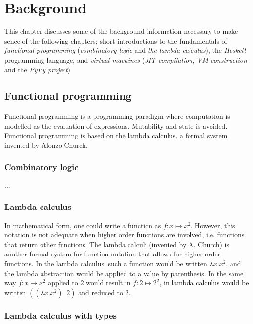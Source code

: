 



\chapter{Background}

This chapter discusses some of the background information necessary to make sence of the
following chapters; short introductions to the fundamentals of \emph{functional programming} 
(\emph{combinatory logic} and \emph{the lambda calculus}), the \emph{Haskell} 
programming language, and \emph{virtual machines} (\emph{JIT compilation}, \emph{VM construction} 
and the \emph{PyPy project})






\section{Functional programming}

Functional programming is a programming paradigm where computation is modelled as the evaluation
of expressions. Mutability and state is avoided. Functional programming is based on the 
lambda calculus, a formal system invented by Alonzo Church.

\subsection{Combinatory logic}

...

\subsection{Lambda calculus}

In mathematical form, one
could write a function as $f : x \mapsto x^2$. However, this notation is not adequate when
higher order functions are involved, i.e. functions that return other functions. The lambda calculi
(invented by A. Church) is another formal system for function notation that allows for higher
order functions. In the lambda calculus, such a function would be written $\lambda x.x^2$, and the
lambda abstraction would be applied to a value by parenthesis. In the same way $f : x \mapsto x^2$
applied to $2$ would result in $f : 2 \mapsto 2^2$, in lambda calculus would be 
written $((\lambda x.x^2) \;\; 2)$ and reduced to $2$.

\subsection{Lambda calculus with types}


